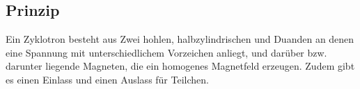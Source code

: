 




%
%	





\subsection{Prinzip}

Ein Zyklotron besteht aus Zwei hohlen, halbzylindrischen und Duanden an denen eine Spannung mit unterschiedlichem Vorzeichen anliegt, und darüber bzw. darunter liegende Magneten, die ein homogenes Magnetfeld erzeugen. Zudem gibt es einen Einlass und einen Auslass für Teilchen.


	
